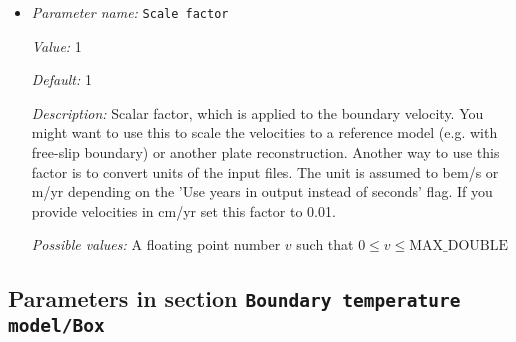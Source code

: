 \begin{itemize}
{\it Possible values:} An integer $n$ such that $-2147483648\leq n \leq 2147483647$
\item {\it Parameter name:} {\tt Scale factor}
\label{parameters:Boundary temperature model/Ascii data model/Scale factor}


{\it Value:} 1


{\it Default:} 1


{\it Description:} Scalar factor, which is applied to the boundary velocity. You might want to use this to scale the velocities to a reference model (e.g. with free-slip boundary) or another plate reconstruction. Another way to use this factor is to convert units of the input files. The unit is assumed to bem/s or m/yr depending on the 'Use years in output instead of seconds' flag. If you provide velocities in cm/yr set this factor to 0.01.


{\it Possible values:} A floating point number $v$ such that $0 \leq v \leq \text{MAX\_DOUBLE}$
\end{itemize}

\subsection{Parameters in section \tt Boundary temperature model/Box}
\label{parameters:Boundary_20temperature_20model/Box}

